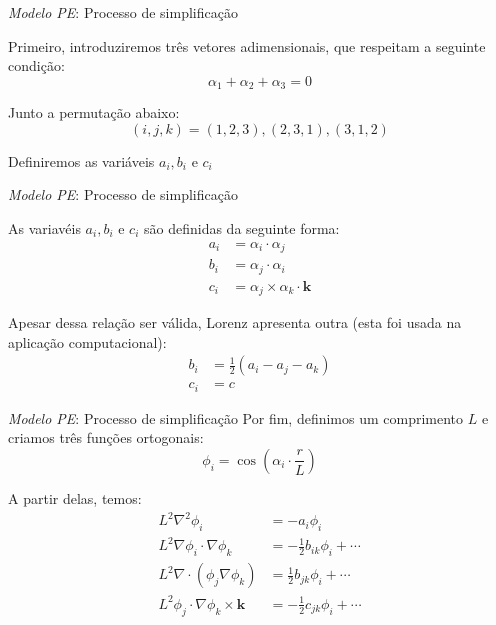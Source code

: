 
\begin{frame}{\textit{Modelo PE}: Processo de simplificação}

Primeiro, introduziremos três vetores adimensionais, que respeitam a seguinte condição:
\begin{equation}
    \alpha_1 + \alpha_2 + \alpha_3 = 0
\end{equation}

Junto a permutação abaixo:
\begin{equation}
    (i, j, k) = (1,2,3), (2,3,1), (3,1,2) \label{eq:permutacao}
\end{equation}

Definiremos as variáveis $a_i, b_i$ e $c_i$
\end{frame}


\begin{frame}{\textit{Modelo PE}: Processo de simplificação}

As variavéis $a_i, b_i$ e $c_i$ são definidas da seguinte forma:
\begin{align*}
    a_i &= \alpha_i \cdot \alpha_j\\
    b_i &= \alpha_j \cdot \alpha_i\\
    c_i &= \alpha_j \times \alpha_k \cdot \mathbf{k}
\end{align*}

Apesar dessa relação ser válida, Lorenz apresenta outra (esta foi usada na aplicação computacional):
    \begin{align*}
        b_i &= \frac{1}{2}\left(a_i - a_j - a_k\right)\\
        c_i &= c
    \end{align*}
\end{frame}


\begin{frame}{\textit{Modelo PE}: Processo de simplificação}
    Por fim, definimos um comprimento $L$ e criamos três funções ortogonais:
    \begin{equation*}
        \phi_i = \cos\left(\alpha_i \cdot \frac{r}{L}\right)
    \end{equation*}

    A partir delas, temos:
    \small
    \begin{align*}
        L^2\nabla^2\phi_i &= -a_i\phi_i \\
        L^2\nabla\phi_i \cdot \nabla\phi_k &= -\frac{1}{2}b_{ik}\phi_i + \cdots \\
        L^2\nabla \cdot (\phi_j\nabla\phi_k) &= \frac{1}{2}b_{jk}\phi_i + \cdots \\
        L^2\phi_j \cdot \nabla\phi_k \times \mathbf{k} &= -\frac{1}{2}c_{jk}\phi_i + \cdots
    \end{align*}
\end{frame}


